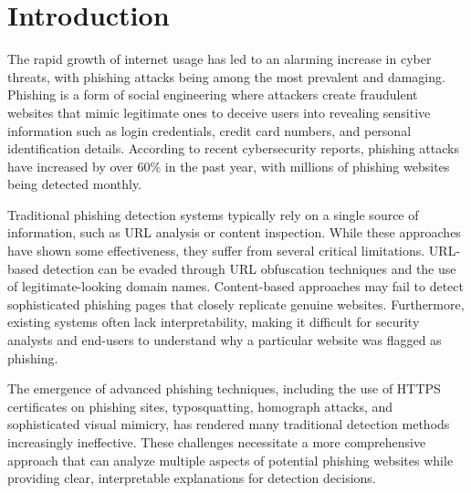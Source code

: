 \documentclass[12pt,a4paper]{report}
\begin{document}
\listoffigures


\clearpage
{}
{}

\listoftables

\clearpage
{}
\setcounter{page}{1}

\chapter{Introduction}

The rapid growth of internet usage has led to an alarming increase in cyber threats, with phishing attacks being among the most prevalent and damaging. Phishing is a form of social engineering where attackers create fraudulent websites that mimic legitimate ones to deceive users into revealing sensitive information such as login credentials, credit card numbers, and personal identification details. According to recent cybersecurity reports, phishing attacks have increased by over 60\% in the past year, with millions of phishing websites being detected monthly.

Traditional phishing detection systems typically rely on a single source of information, such as URL analysis or content inspection. While these approaches have shown some effectiveness, they suffer from several critical limitations. URL-based detection can be evaded through URL obfuscation techniques and the use of legitimate-looking domain names. Content-based approaches may fail to detect sophisticated phishing pages that closely replicate genuine websites. Furthermore, existing systems often lack interpretability, making it difficult for security analysts and end-users to understand why a particular website was flagged as phishing.

The emergence of advanced phishing techniques, including the use of HTTPS certificates on phishing sites, typosquatting, homograph attacks, and sophisticated visual mimicry, has rendered many traditional detection methods increasingly ineffective. These challenges necessitate a more comprehensive approach that can analyze multiple aspects of potential phishing websites while providing clear, interpretable explanations for detection decisions.
\end{document}
